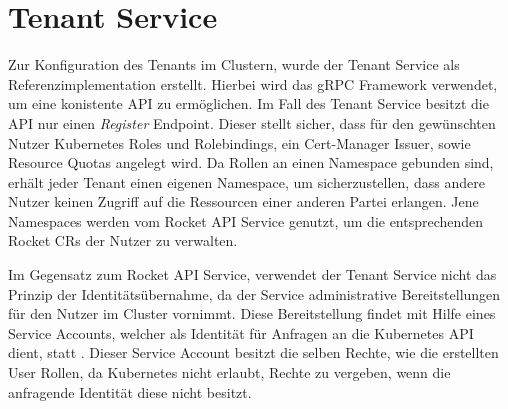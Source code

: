 \section{Tenant Service}
\label{sec:komponenten:tenant-service}
Zur Konfiguration des Tenants im Clustern, wurde der Tenant Service als Referenzimplementation erstellt. Hierbei
wird das gRPC Framework verwendet, um eine konistente API zu ermöglichen. Im Fall des Tenant Service
besitzt die API nur einen \emph{Register} Endpoint. Dieser stellt sicher, dass für den gewünschten Nutzer 
Kubernetes Roles und Rolebindings, ein Cert-Manager Issuer, sowie Resource Quotas angelegt wird. 
Da Rollen an einen Namespace gebunden sind, erhält jeder Tenant einen eigenen Namespace, um sicherzustellen,
dass andere Nutzer keinen Zugriff auf die Ressourcen einer anderen Partei erlangen.
Jene Namespaces werden vom Rocket API Service genutzt, um die entsprechenden Rocket \acp{CR} der Nutzer zu verwalten. 

Im Gegensatz zum Rocket API Service, verwendet der Tenant Service nicht das Prinzip der Identitätsübernahme, da
der Service administrative Bereitstellungen für den Nutzer im Cluster vornimmt. 
Diese Bereitstellung findet mit Hilfe eines Service Accounts, welcher als Identität für Anfragen 
an die Kubernetes API dient, statt . Dieser Service Account besitzt die selben Rechte,
wie die erstellten User Rollen, da Kubernetes nicht erlaubt, Rechte zu vergeben, wenn die anfragende Identität
diese nicht besitzt.

